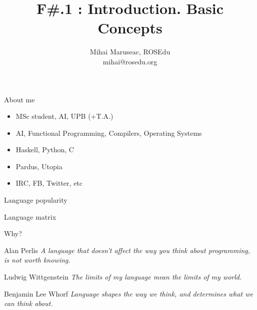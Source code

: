 \documentclass{beamer}
\title{F\#.1 : Introduction. Basic Concepts}
\author{Mihai Maruseac, ROSEdu\\mihai@rosedu.org}
\begin{document}
\maketitle

\begin{frame}{About me}
  \begin{itemize}
    \item MSc student, AI, UPB (+T.A.)
    \item AI, Functional Programming, Compilers, Operating Systems
    \item Haskell, Python, C
    \item Pardus, Utopia
    \item IRC, FB, Twitter, etc
  \end{itemize}
\end{frame}

\begin{frame}{Language popularity}
  \center
\end{frame}

\begin{frame}{Language matrix}
  \center
\end{frame}

\begin{frame}{Why?}
  \begin{block}{Alan Perlis}
   \textit{A language that doesn't affect the way you think about programming, is not
   worth knowing.}
  \end{block}
  \pause
  \begin{block}{Ludwig Wittgenstein}
   \textit{The limits of my language mean the limits of my world.}
  \end{block}
  \pause
  \begin{block}{Benjamin Lee Whorf}
   \textit{Language shapes the way we think, and determines what we can think
   about.}
  \end{block}
\end{frame}
\end{document}
